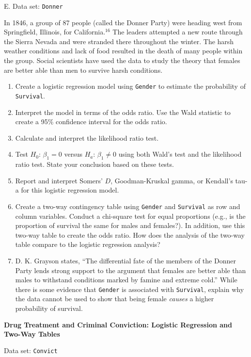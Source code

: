 \documentclass[
]{report}
\newcounter{excount}
\renewcommand{\theexcount}{E\arabic{excount}}
\begin{document}
\begin{list}{\theexcount.}{ \setlength{\itemsep}{1.2em}}
Data set: \texttt{Donner}

In 1846, a group of 87 people (called the Donner Party) were heading west from Springfield, Illinois, for California.$^{16}$ The leaders attempted a new route through the Sierra Nevada and were stranded there throughout the winter. The harsh weather conditions and lack of food resulted in the death of many people within the group. Social scientists have used the data to study the theory that females are better able than men to survive harsh conditions.

  \begin{enumerate}
    \item Create a logistic regression model using \texttt{Gender} to estimate the probability of \texttt{Survival}.
    \item Interpret the model in terms of the odds ratio. Use the Wald statistic to create a 95\% confidence interval for the odds ratio.
    \item Calculate and interpret the likelihood ratio test.
    \item Test $H_0$: $\beta_1 = 0$ versus $H_a$: $\beta_1 \ne 0$ using both Wald’s test and the likelihood ratio test. State your conclusion based on these tests.
    \item Report and interpret Somers’ $D$, Goodman-Kruskal gamma, or Kendall’s tau-a for this logistic regression model.
    \item Create a two-way contingency table using \texttt{Gender} and \texttt{Survival} as row and column variables. Conduct a chi-square test for equal proportions (e.g., is the proportion of survival the same for males and females?). In addition, use this two-way table to create the odds ratio. How does the analysis of the two-way table compare to the logistic regression analysis?
    \item D. K. Grayson states, “The differential fate of the members of the Donner Party lends strong support to the argument that females are better able than males to withstand conditions marked by famine and extreme cold.” While there is some evidence that \texttt{Gender} is associated with \texttt{Survival}, explain why the data cannot be used to show that being female \textit{causes} a higher probability of survival.
  \end{enumerate}

  \item \textbf{Drug Treatment and Criminal Conviction: Logistic Regression and Two-Way Tables}

Data set: \texttt{Convict}


\end{list}
\end{document}
